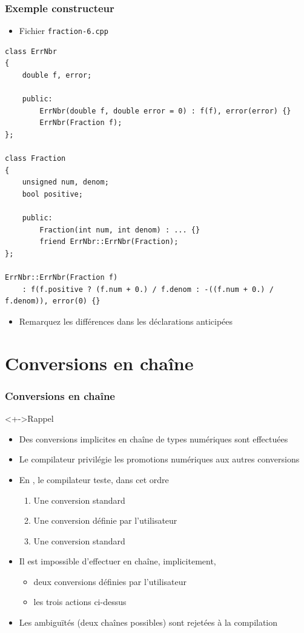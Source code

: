 \begin{frame}[containsverbatim]
\frametitle{Exemple constructeur}
\begin{itemize}
\item Fichier \texttt{fraction-6.cpp}
\end{itemize}
\begin{lstlisting}
class ErrNbr
{
	double f, error;	

	public:
		ErrNbr(double f, double error = 0) : f(f), error(error) {}
		ErrNbr(Fraction f);
};

class Fraction
{
	unsigned num, denom;
	bool positive;

	public:
		Fraction(int num, int denom) : ... {}
		friend ErrNbr::ErrNbr(Fraction);
};

ErrNbr::ErrNbr(Fraction f)  
	: f(f.positive ? (f.num + 0.) / f.denom : -((f.num + 0.) / f.denom)), error(0) {}
\end{lstlisting}
\begin{itemize}
\item Remarquez les différences dans les déclarations anticipées
\end{itemize}
\end{frame}

\section{Conversions en chaîne}

\begin{frame}
\frametitle{Conversions en chaîne}
\begin{exampleblock}<+->{Rappel}
	\begin{itemize}[<+->]
	\item Des conversions implicites en chaîne de types numériques sont effectuées
	\item Le compilateur privilégie les promotions numériques aux autres conversions
	\end{itemize}
\end{exampleblock}
\begin{itemize}[<+->]
\item En \cpp, le compilateur teste, dans cet ordre
	\begin{enumerate}
	\item Une conversion standard
	\item Une conversion définie par l'utilisateur
	\item Une conversion standard
	\end{enumerate}
\item Il est impossible d'effectuer en chaîne, implicitement, 
	\begin{itemize}
	\item deux conversions définies par l'utilisateur
	\item les trois actions ci-dessus
	\end{itemize}
\item Les ambiguïtés (deux chaînes possibles) sont rejetées à la compilation
\end{itemize}
\end{frame}


